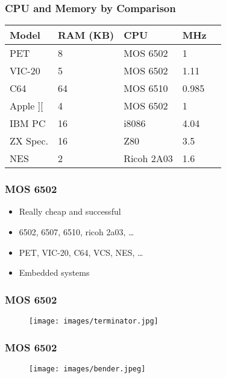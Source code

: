\documentclass[aspectratio=43]{uva-inf-presentation}
\begin{document}

\begin{frame}
\frametitle{CPU and Memory by Comparison}

\begin{tabular}{|l|l|l|l|l|}
\hline Model & RAM (KB) & CPU & MHz \\ \hline
PET & 8 & MOS 6502 & 1 \\
VIC-20 & 5 & MOS 6502 & 1.11 \\
C64 & 64 & MOS 6510 & 0.985 \\ \hline
Apple ][ & 4 & MOS 6502 & 1 \\
IBM PC & 16 & i8086 & 4.04 \\
ZX Spec. & 16 & Z80 & 3.5 \\ \hline
NES & 2 & Ricoh 2A03 & 1.6 \\ \hline
\end{tabular}

\end{frame}


\begin{frame}
\frametitle{MOS 6502}

\begin{itemize}
\item Really cheap and successful
\item 6502, 6507, 6510, ricoh 2a03, \dots
\item PET, VIC-20, C64, VCS, NES, \dots
\item Embedded systems
\end{itemize}

\end{frame}


\begin{frame}
\frametitle{MOS 6502}

\begin{figure}
\texttt{[image: images/terminator.jpg]}
\end{figure}

\end{frame}


\begin{frame}
\frametitle{MOS 6502}

\begin{figure}
\texttt{[image: images/bender.jpeg]}
\end{figure}

\end{frame}
\end{document}

